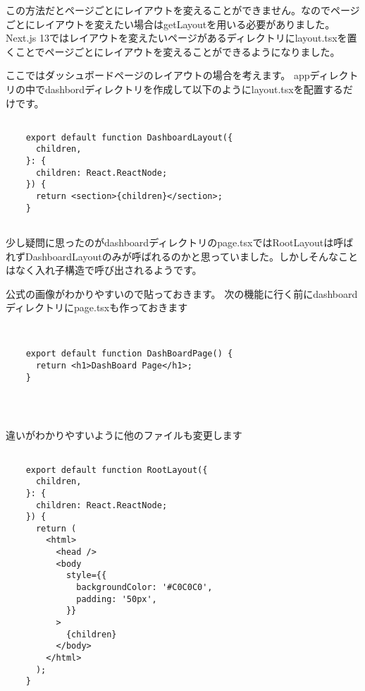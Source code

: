 この方法だとページごとにレイアウトを変えることができません。なのでページごとにレイアウトを変えたい場合はgetLayoutを用いる必要がありました。Next.js 13ではレイアウトを変えたいページがあるディレクトリにlayout.tsxを置くことでページごとにレイアウトを変えることができるようになりました。


ここではダッシュボードページのレイアウトの場合を考えます。
appディレクトリの中でdashbordディレクトリを作成して以下のようにlayout.tsxを配置するだけです。



\begin{tcolorbox}[breakable]
  \begin{verbatim}

    export default function DashboardLayout({
      children,
    }: {
      children: React.ReactNode;
    }) {
      return <section>{children}</section>;
    }
    

  \end{verbatim}
\end{tcolorbox}


少し疑問に思ったのがdashboardディレクトリのpage.tsxではRootLayoutは呼ばれずDashboardLayoutのみが呼ばれるのかと思っていました。しかしそんなことはなく入れ子構造で呼び出されるようです。

公式の画像がわかりやすいので貼っておきます。
次の機能に行く前にdashboardディレクトリにpage.tsxも作っておきます

\begin{tcolorbox}[breakable]
  \begin{verbatim}


    export default function DashBoardPage() {
      return <h1>DashBoard Page</h1>;
    }
    
  
  
    \end{verbatim}
\end{tcolorbox}




違いがわかりやすいように他のファイルも変更します

\begin{tcolorbox}[breakable]
  \begin{verbatim}
    
    export default function RootLayout({
      children,
    }: {
      children: React.ReactNode;
    }) {
      return (
        <html>
          <head />
          <body
            style={{
              backgroundColor: '#C0C0C0',
              padding: '50px',
            }}
          >
            {children}
          </body>
        </html>
      );
    }
    
    
    
      \end{verbatim}
\end{tcolorbox}




